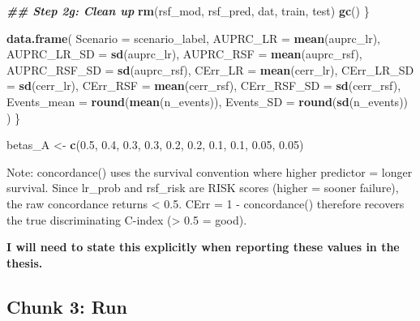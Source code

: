\documentclass[
]{article}
\newenvironment{Shaded}{\begin{snugshade}}{\end{snugshade}}
\newcommand{\AttributeTok}[1]{\textcolor[rgb]{0.13,0.29,0.53}{#1}}
\newcommand{\DocumentationTok}[1]{\textcolor[rgb]{0.56,0.35,0.01}{\textbf{\textit{#1}}}}
\newcommand{\FloatTok}[1]{\textcolor[rgb]{0.00,0.00,0.81}{#1}}
\newcommand{\FunctionTok}[1]{\textcolor[rgb]{0.13,0.29,0.53}{\textbf{#1}}}
\newcommand{\NormalTok}[1]{#1}
\newcommand{\OtherTok}[1]{\textcolor[rgb]{0.56,0.35,0.01}{#1}}
\begin{document}
\begin{Shaded}
\begin{Highlighting}[]
    \DocumentationTok{\#\# Step 2g: Clean up}
    \FunctionTok{rm}\NormalTok{(rsf\_mod, rsf\_pred, dat, train, test)}
    \FunctionTok{gc}\NormalTok{()}
\NormalTok{  \}}
  
  \FunctionTok{data.frame}\NormalTok{(}
    \AttributeTok{Scenario     =}\NormalTok{ scenario\_label,}
    \AttributeTok{AUPRC\_LR     =} \FunctionTok{mean}\NormalTok{(auprc\_lr),   }\AttributeTok{AUPRC\_LR\_SD  =} \FunctionTok{sd}\NormalTok{(auprc\_lr),}
    \AttributeTok{AUPRC\_RSF    =} \FunctionTok{mean}\NormalTok{(auprc\_rsf),  }\AttributeTok{AUPRC\_RSF\_SD =} \FunctionTok{sd}\NormalTok{(auprc\_rsf),}
    \AttributeTok{CErr\_LR      =} \FunctionTok{mean}\NormalTok{(cerr\_lr),    }\AttributeTok{CErr\_LR\_SD   =} \FunctionTok{sd}\NormalTok{(cerr\_lr),}
    \AttributeTok{CErr\_RSF     =} \FunctionTok{mean}\NormalTok{(cerr\_rsf),   }\AttributeTok{CErr\_RSF\_SD  =} \FunctionTok{sd}\NormalTok{(cerr\_rsf),}
    \AttributeTok{Events\_mean  =} \FunctionTok{round}\NormalTok{(}\FunctionTok{mean}\NormalTok{(n\_events)),}
    \AttributeTok{Events\_SD    =} \FunctionTok{round}\NormalTok{(}\FunctionTok{sd}\NormalTok{(n\_events))}
\NormalTok{  )}
\NormalTok{\}}

\NormalTok{betas\_A }\OtherTok{\textless{}{-}} \FunctionTok{c}\NormalTok{(}\FloatTok{0.5}\NormalTok{, }\FloatTok{0.4}\NormalTok{, }\FloatTok{0.3}\NormalTok{, }\FloatTok{0.3}\NormalTok{, }\FloatTok{0.2}\NormalTok{, }\FloatTok{0.2}\NormalTok{, }\FloatTok{0.1}\NormalTok{, }\FloatTok{0.1}\NormalTok{, }\FloatTok{0.05}\NormalTok{, }\FloatTok{0.05}\NormalTok{)}
\end{Highlighting}
\end{Shaded}

Note: concordance() uses the survival convention where higher predictor
= longer survival. Since lr\_prob and rsf\_risk are RISK scores (higher
= sooner failure), the raw concordance returns \textless{} 0.5. CErr = 1
- concordance() therefore recovers the true discriminating C-index
(\textgreater{} 0.5 = good).

\textbf{I will need to state this explicitly when reporting these values
in the thesis.}

\subsection{Chunk 3: Run}\label{chunk-3-run}
\end{document}
